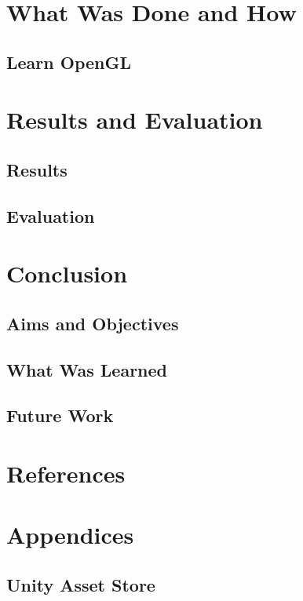 \documentclass[12pt]{article}
\begin{document}
    \section{What Was Done and How}

    \subsection{Learn OpenGL}


    \section{Results and Evaluation}
    \subsection{Results}
    \subsection{Evaluation}

    \section{Conclusion}
    \subsection{Aims and Objectives}
    \subsection{What Was Learned}
    \subsection{Future Work}

    \newpage
    \section{References}
    

    \newpage
    \section{Appendices}

    \subsection{Unity Asset Store}
\end{document}
